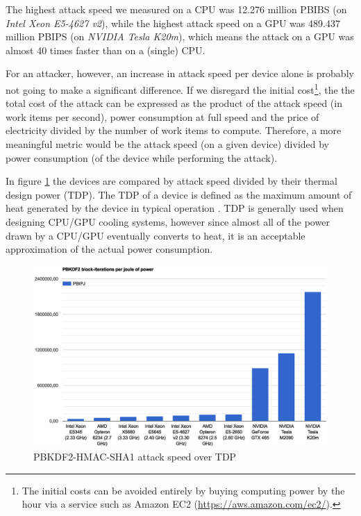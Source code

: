 \documentclass[12pt,oneside]{fithesis2}
\begin{document}
      The highest attack speed we measured on a CPU was 12.276 million PBIBS (on \emph{Intel Xeon E5-4627 v2}), while the highest attack speed on a GPU was 489.437 million PBIPS (on \emph{NVIDIA Tesla K20m}), which means the attack on a GPU was almost 40 times faster than on a (single) CPU.
      
      For an attacker, however, an increase in attack speed per device alone is probably not going to make a significant difference. If we disregard the initial cost\footnote{The initial costs can be avoided entirely by buying computing power by the hour via a service such as Amazon EC2 (\url{https://aws.amazon.com/ec2/}).}, the the total cost of the attack can be expressed as the product of the attack speed (in work items per second), power consumption at full speed and the price of electricity divided by the number of work items to compute. Therefore, a more meaningful metric would be the attack speed (on a given device) divided by power consumption (of the device while performing the attack).
      
      In figure \ref{graph:devices:power} the devices are compared by attack speed divided by their thermal design power (TDP). The TDP of a device is defined as the maximum amount of heat generated by the device in typical operation \cite{tdp}. TDP is generally used when designing CPU/GPU cooling systems, however since almost all of the power drawn by a CPU/GPU eventually converts to heat, it is an acceptable approximation of the actual power consumption.
      
      \begin{figure}
        \centering
        \includegraphics[width=\linewidth, clip=true, trim=3cm 1cm 2cm 3cm]{images/devices-power-consumption.eps}
        \caption{PBKDF2-HMAC-SHA1 attack speed over TDP}
        \label{graph:devices:power}
      \end{figure}
      
\end{document}
